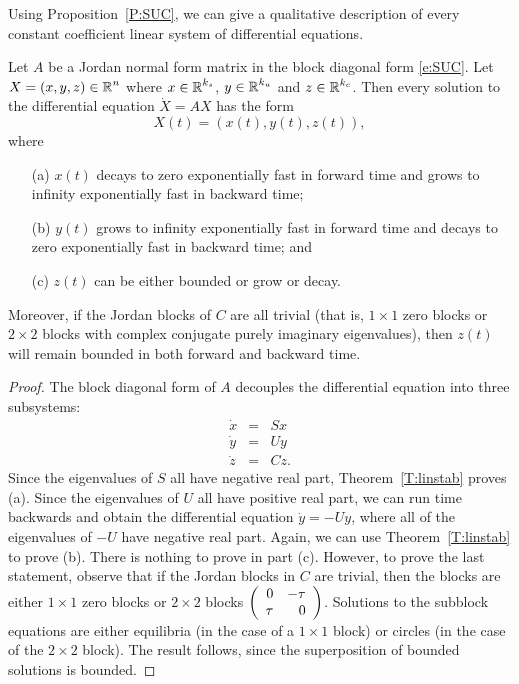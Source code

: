 \documentclass{ximera}
\begin{document}
Using Proposition~\ref{P:SUC}, we can give a qualitative description of 
every constant coefficient linear system of differential equations.
\begin{theorem}  \label{T:SUC}
Let $A$ be a Jordan normal form matrix in the block diagonal form \eqref{e:SUC}.
Let $X=(x,y,z)\in\mbox{$\Bbb{R}$}^n$ where $x\in\mbox{$\Bbb{R}$}^{k_s}$, $y\in\mbox{$\Bbb{R}$}^{k_u}$ and $z\in\mbox{$\Bbb{R}$}^{k_c}$.
Then every solution to the differential equation $\dot{X}=AX$ has the form
\[
X(t) = (x(t), y(t),z(t)),
\]
where
\begin{itemize}
\item[(a)]  $x(t)$ decays to zero exponentially fast in 
	forward time and grows to 
	infinity exponentially fast in backward time;
\item[(b)]  $y(t)$ grows to infinity exponentially fast in forward time and 
	decays to zero exponentially fast in backward time; and
\item[(c)]  $z(t)$ can be either bounded or grow or decay. 
\end{itemize}
Moreover, if the Jordan blocks of $C$ are all trivial
(that is, $1\times 1$ zero blocks or $2\times 2$ blocks with complex
conjugate purely imaginary eigenvalues), then $z(t)$ will remain bounded in 
both forward and backward time. 
\end{theorem}

\begin{proof}  The block diagonal form of $A$ decouples the differential equation 
into three subsystems:
\begin{eqnarray*}
\dot{x} & = & Sx \\
\dot{y} & = & Uy \\
\dot{z} & = & Cz.
\end{eqnarray*}  
Since the eigenvalues of $S$ all have negative real part, Theorem~\ref{T:linstab} proves (a).  Since the eigenvalues of $U$ all have 
positive real part, we can run time backwards and obtain the differential 
equation $\dot{y}=-Uy$, where all of the eigenvalues of $-U$ have negative 
real part.  Again, we can use Theorem~\ref{T:linstab} to prove (b).  There 
is nothing to prove in part (c).  However, to prove the last statement, observe
that if the Jordan blocks in $C$ are trivial, then the blocks are either
$1\times 1$ zero blocks or $2\times 2$ blocks $\left(\begin{array}{rr} 0 & -\tau\\ \tau &0\end{array}\right)$.
Solutions to the subblock equations are either equilibria (in the case of a
$1\times 1$ block) or circles (in the case of the $2\times 2$ block).  The
result follows, since the superposition of bounded solutions is bounded. \end{proof}
\end{document}
